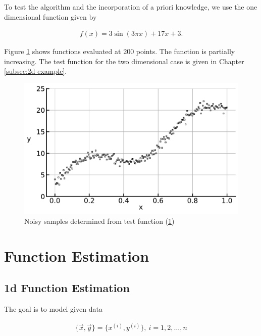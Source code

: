 \documentclass[10pt,a4paper]{report}
\begin{document}
To test the algorithm and the incorporation of a priori knowledge, we use the one dimensional function given by 

\begin{align}\label{eq:test_func}
	f(x) = 3\sin(3\pi x) + 17x + 3.
\end{align}

Figure \ref{fig:test_func} shows functions evaluated at 200 points. The function is partially increasing.  The test function for the two dimensional case is given in Chapter \ref{subsec:2d-example}. 

\begin{figure}[H]
	\centering
	\includegraphics[width=\columnwidth]{../thesisplots/test_func.pdf}
	\caption{Noisy samples determined from test function (\ref{fig:test_func})}
	\label{fig:test_func}
\end{figure}

\section{Function Estimation}

\subsection{1d Function Estimation} \label{subsec:1d-function-estimation}

The goal is to model given data

\begin{align} \label{eq:data}
	\{\vec{x}, \vec{y}\} = \{x^{(i)}, y^{(i)}\}, \ i=1, 2, \dots, n 
\end{align}
\end{document}
